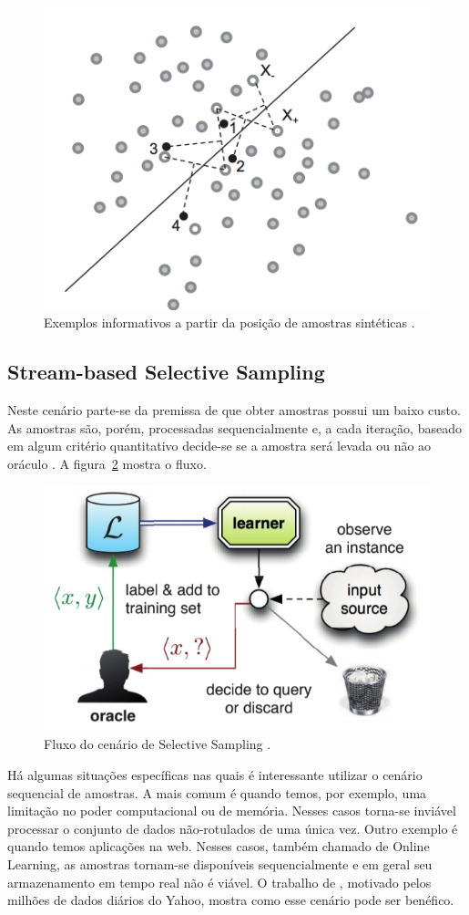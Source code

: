 \begin{figure}
  \centering
  \includegraphics[width=.5\textwidth]{figures/wang_2015_membership.png}
  \caption{Exemplos informativos a partir da posição de amostras sintéticas \citep{wang2015active}.}
  \label{fig:wang_2015_membership}
\end{figure}


\subsection{Stream-based Selective Sampling}
\label{sec:cenarios_selective_sampling}

Neste cenário parte-se da premissa de que obter amostras possui um baixo custo. As amostras são, porém, processadas sequencialmente e, a cada iteração, baseado em algum critério quantitativo decide-se se a amostra será levada ou não ao oráculo \citep{settles2014active}. A figura~\ref{fig:settles_2014_selective_sampling} mostra o fluxo. 

\begin{figure}
  \centering
  \includegraphics[width=.5\textwidth]{figures/settles_2014_selective_sampling.png}
  \caption{Fluxo do cenário de Selective Sampling \citep{settles2014active}.}
  \label{fig:settles_2014_selective_sampling}
\end{figure}


Há algumas situações específicas nas quais é interessante utilizar o cenário sequencial de amostras. A mais comum é quando temos, por exemplo, uma limitação no poder computacional ou de memória. Nesses casos torna-se inviável processar o conjunto de dados não-rotulados de uma única vez. Outro exemplo é quando temos aplicações na web. Nesses casos, também chamado de Online Learning, as amostras tornam-se disponíveis sequencialmente e em geral seu armazenamento em tempo real não é viável. O trabalho de \citep{chu2011unbiased}, motivado pelos milhões de dados diários do Yahoo, mostra como esse cenário pode ser benéfico. 




